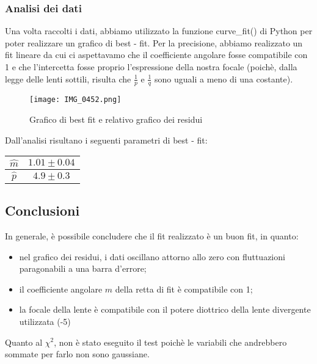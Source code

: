 \documentclass{article}
\begin{document}
\vspace{1em}

\subsubsection{Analisi dei dati} %
Una volta raccolti i dati, abbiamo utilizzato la funzione curve\_fit() di Python per poter realizzare un grafico di best - fit. Per la precisione, abbiamo realizzato un fit lineare da cui ci aspettavamo che il coefficiente angolare fosse compatibile con 1 e che l'intercetta fosse proprio l'espressione della nostra focale (poichè, dalla legge delle lenti sottili, risulta che $\frac{1}{p}$ e $\frac{1}{q}$ sono uguali a meno di una costante).

\begin{figure} [H]
    \centering
    \texttt{[image: IMG\_0452.png]}
    \caption{Grafico di best fit e relativo grafico dei residui }
    \label{fig:my_label}
\end{figure}
\FloatBarrier

Dall'analisi risultano i seguenti parametri di best - fit:

\begin{center}
    \begin{tabular}{c|c}
    \toprule
     $\hat{m}$ & $1.01 \pm 0.04$  \\
     \midrule
     $\hat{p}$ & $4.9 \pm 0.3$ \\
     \bottomrule
 \end{tabular}   
\end{center}

\vspace{2em}

\subsection{Conclusioni} %
In generale, è possibile concludere che il fit realizzato è un buon fit, in quanto:\\

\begin{itemize}
    \item nel grafico dei residui, i dati oscillano attorno allo zero con fluttuazioni paragonabili a una barra d'errore;
    \item il coefficiente angolare $m$ della retta di fit è compatibile con 1;
    \item la focale della lente è compatibile con il potere diottrico della lente divergente utilizzata (-5)
\end{itemize}

Quanto al $\chi^2$, non è stato eseguito il test poichè le variabili che andrebbero sommate per farlo non sono gaussiane.
\end{document}
